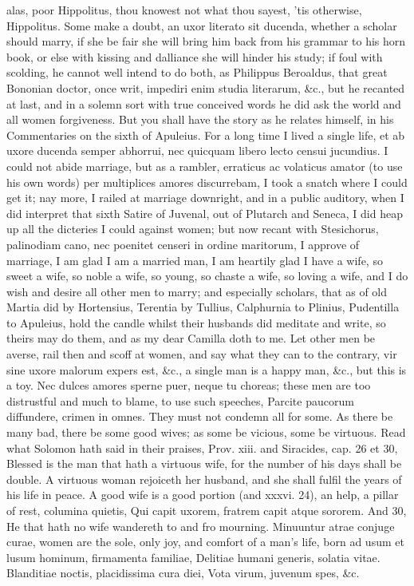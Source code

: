 {alas, poor Hippolitus, thou knowest not what thou sayest, 'tis
otherwise, Hippolitus. Some make a doubt, an uxor literato sit
ducenda, whether a scholar should marry, if she be fair she will bring
him back from his grammar to his horn book, or else with kissing and
dalliance she will hinder his study; if foul with scolding, he cannot
well intend to do both, as Philippus Beroaldus, that great Bononian
doctor, once writ, impediri enim studia literarum, \&c., but he recanted
at last, and in a solemn sort with true conceived words he did ask the
world and all women forgiveness. But you shall have the story as he
relates himself, in his Commentaries on the sixth of Apuleius. For a
long time I lived a single life, et ab uxore ducenda semper abhorrui,
nec quicquam libero lecto censui jucundius. I could not abide marriage,
but as a rambler, erraticus ac volaticus amator (to use his own words)
per multiplices amores discurrebam, I took a snatch where I could get
it; nay more, I railed at marriage downright, and in a public auditory,
when I did interpret that sixth Satire of Juvenal, out of Plutarch and
Seneca, I did heap up all the dicteries I could against women; but now
recant with Stesichorus, palinodiam cano, nec poenitet censeri in
ordine maritorum, I approve of marriage, I am glad I am a married
man, I am heartily glad I have a wife, so sweet a wife, so noble a
wife, so young, so chaste a wife, so loving a wife, and I do wish and
desire all other men to marry; and especially scholars, that as of old
Martia did by Hortensius, Terentia by Tullius, Calphurnia to Plinius,
Pudentilla to Apuleius, hold the candle whilst their husbands did
meditate and write, so theirs may do them, and as my dear Camilla doth
to me. Let other men be averse, rail then and scoff at women, and say
what they can to the contrary, vir sine uxore malorum expers est, \&c.,
a single man is a happy man, \&c., but this is a toy. Nec dulces
amores sperne puer, neque tu choreas; these men are too distrustful and
much to blame, to use such speeches, Parcite paucorum diffundere,
crimen in omnes. They must not condemn all for some. As there be many
bad, there be some good wives; as some be vicious, some be virtuous.
Read what Solomon hath said in their praises, Prov. xiii. and
Siracides, cap. 26 et 30, Blessed is the man that hath a virtuous wife,
for the number of his days shall be double. A virtuous woman rejoiceth
her husband, and she shall fulfil the years of his life in peace. A
good wife is a good portion (and xxxvi. 24), an help, a pillar of rest,
columina quietis,  Qui capit uxorem, fratrem capit atque sororem.
And 30, He that hath no wife wandereth to and fro mourning. Minuuntur
atrae conjuge curae, women are the sole, only joy, and comfort of a
man's life, born ad usum et lusum hominum, firmamenta familiae,
Delitiae humani generis, solatia vitae.
Blanditiae noctis, placidissima cura diei,
Vota virum, juvenum spes, \&c.

}
